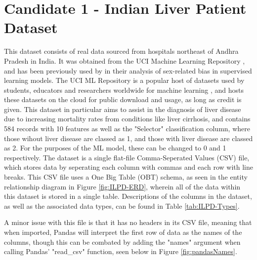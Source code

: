 \documentclass[12pt]{report}
\begin{document}

\section{Candidate 1 - Indian Liver Patient Dataset}
This dataset consists of real data sourced from hospitals northeast of Andhra Pradesh in India. It was obtained from the UCI 
Machine Learning Repository \autocite{bendi_ramana_ilpd_2022}, and has been previously used by \textcite{straw_investigating_2022} 
in their analysis of sex-related bias in supervised learning models. The UCI ML Repository is a popular host of datasets used by students, 
educators and researchers worldwide for machine learning \autocite{uci_machine_learning_repository_about_nodate}, and hosts these datasets 
on the cloud for public download and usage, as long as credit is given. This dataset in particular aims to assist in the diagnosis of liver
disease due to increasing mortality rates from conditions like liver cirrhosis, and contains 584 records with 10 features
as well as the "Selector" classification column, where those wihout liver disease are classed as 1, and those with liver disease 
are classed as 2. For the purposes of the ML model, these can be changed to 0 and 1 respectively. 
The dataset is a single flat-file Comma-Seperated Values (CSV) file, which stores data by seperating each column with commas
and each row with line breaks. This CSV file uses a One Big Table (OBT) schema, as seen in the entity relationship diagram 
in Figure \ref{fig:ILPD-ERD}, wherein all of the data within this dataset is stored in a single table. %
Descriptions of the columns in the dataset, as well as the associated data types, can be found in Table \ref{tab:ILPD-Types}.


A minor issue with this file is that it has no headers in its CSV file, meaning that when imported, Pandas will interpret the first 
row of data as the names of the columns, though this can be combated by adding the "names" argument when calling Pandas' "read\_csv" function,
seen below in Figure \ref{fig:pandasNames}. 
\end{document}
